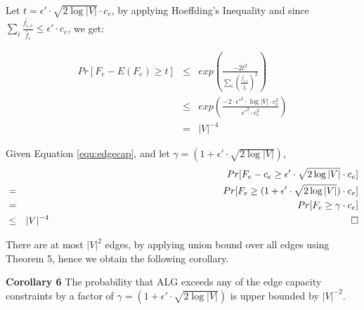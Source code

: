 \documentclass[conference]{IEEEtran}
\newcommand*{\QEDB}{\hfill\ensuremath{\square}}%
\begin{document}
Let $t=\epsilon' \cdot \sqrt{2\log|V|} \cdot c_e$, by applying Hoeffding's Inequality and since $\sum_i \frac{\tilde{f_{i,e}}}{\tilde{f_i}} \le \epsilon' \cdot c_e$, we get:

\begin{eqnarray}
Pr[F_e - E(F_e) \ge t] &\le& exp(\frac{-2t^2}{\sum_{i}(\frac{\tilde{f_{i,e}}}{\tilde{f_i}})^2}) \\ \nonumber
&\le& exp(\frac{-2 \cdot \epsilon'^2 \cdot \log|V| \cdot c_e^2}{\epsilon'^2 \cdot c_e^2}) \\ \nonumber
&=& |V|^{-4}
\end{eqnarray}


Given Equation \ref{equ:edgecap}, and let $\gamma = (1+\epsilon' \cdot \sqrt{2\log|V|})$,
\begin{eqnarray} \nonumber
&&Pr[F_e - c_e \ge \epsilon' \cdot \sqrt{2\log|V|} \cdot c_e] \\ \nonumber
&=& Pr[F_e \ge (1+\epsilon' \cdot \sqrt{2\log|V|}) \cdot c_e] \\ \nonumber
&=& Pr[F_e \ge \gamma \cdot c_e] \\ \nonumber
&\le& |V|^{-4} \,\,\,\,\,\,\,\,\,\,\,\,\,\,\,\,\,\,\,\,\,\,\,\,\,\,\,\,\,\,\,\,\,\,\,\,\,\,\,\,\,\,\,\,\,\,\,\,\,\,\,\,\,\,\,\,\,\,\,\,\,\,\,\,\,\,\,\,\,\,\,\,\,\,\,\,\,\,\,\,\,\,\,\,\,\,\,\,\,\,\,\,\,\,\,\,\,\,\,\,\,\,\,\,\,\,\,\,\,\,\,\,\,\,\,\,\,\,\,\,\,\,\,\,\,\,\,\,\,\,\,\,\,\,\,\,\,\,\,\,\,\,\,\,\,\,\,\,\,\,\,\,\,\,\,\,\,\,\,\,\,\,\,\,\,\,\,\,\,\,\,\,\,\,\,\,\,\,\,\,\,\,\,\,\,\,\,\,\,\, \QEDB
\end{eqnarray}

%

There are at most $|V|^2$ edges, by applying union bound over all edges using Theorem 5, hence we obtain the following corollary.

\textbf{Corollary 6} The probability that ALG exceeds any of the edge capacity constraints by a factor of $\gamma = (1+\epsilon' \cdot \sqrt{2\log|V|})$ is upper bounded by $|V|^{-2}$.
\end{document}
